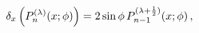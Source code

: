 \[\delta_{x}\left(\mathop{P^{(\lambda)}_{n}\/}\nolimits\!\left(x;\phi\right)%
\right)=2\mathop{\sin\/}\nolimits\phi\mathop{P^{(\lambda+\frac{1}{2})}_{n-1}\/%
}\nolimits\!\left(x;\phi\right),\]